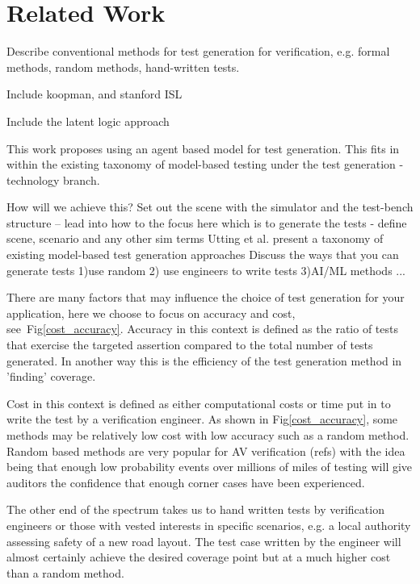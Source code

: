 \documentclass[letterpaper, 10 pt, journal, twoside]{IEEEtran}
\begin{document}



\section{Related Work}
Describe conventional methods for test generation for verification, e.g. formal methods, random methods, hand-written tests.

Include koopman, and stanford ISL

Include the latent logic approach

This work proposes using an agent based model for test generation. This fits in within the existing taxonomy of model-based testing \cite{utting2012taxonomy} under the test generation - technology branch.

How will we achieve this? Set out the scene with the simulator and the test-bench structure -- lead into how to the focus here which is to  generate the tests - define scene, scenario and any other sim terms
Utting et al. \cite{utting2012taxonomy} present a taxonomy of existing model-based test generation approaches
%
Discuss the ways that you can generate tests 1)use random 2) use engineers to write tests 3)AI/ML methods ...

There are many factors that may influence the choice of test generation for your application, here we choose to focus on accuracy and cost, see~Fig\ref{cost_accuracy}. Accuracy in this context is defined as the ratio of tests that exercise the targeted assertion compared to the total number of tests generated. In another way this is the efficiency of the test generation method in 'finding' coverage.

Cost in this context is defined as either computational costs or time put in to write the test by a verification engineer. As shown in Fig\ref{cost_accuracy}, some methods may be relatively low cost with low accuracy such as a random method. Random based methods are very popular for AV verification (refs) with the idea being that enough low probability events over millions of miles of testing will give auditors the confidence that enough corner cases have been experienced.

The other end of the spectrum takes us to hand written tests by verification engineers or those with vested interests in specific scenarios, e.g. a local authority assessing safety of a new road layout. The test case written by the engineer will almost certainly achieve the desired coverage point but at a much higher cost than a random method.
\end{document}
